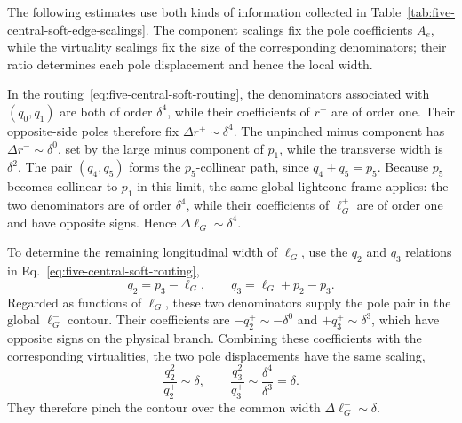 \documentclass[a4paper,11pt]{article}
\begin{document}
The following estimates use both kinds of information collected in
Table~\ref{tab:five-central-soft-edge-scalings}.  The component scalings fix
the pole coefficients \(A_e\), while the virtuality scalings fix the size of
the corresponding denominators; their ratio determines each pole
displacement and hence the local width.

In the routing~\eqref{eq:five-central-soft-routing}, the denominators
associated with \((q_0,q_1)\) are both of order \(\delta^4\), while their
coefficients of \(r^+\) are of order one.  Their opposite-side poles
therefore fix \(\Delta r^+\sim\delta^4\).  The unpinched minus component
has \(\Delta r^-\sim\delta^0\), set by the large minus component of
\(p_1\), while the transverse width is \(\delta^2\).  The pair
\((q_4,q_5)\) forms the \(p_5\)-collinear path, since \(q_4+q_5=p_5\).
Because \(p_5\) becomes collinear to \(p_1\) in this limit, the same global
lightcone frame applies: the two denominators are of order \(\delta^4\),
while their coefficients of \(\ell_G^+\) are of order one and have opposite
signs.  Hence \(\Delta\ell_G^+\sim\delta^4\).

To determine the remaining longitudinal width of \(\ell_G\), use the
\(q_2\) and \(q_3\) relations in Eq.~\eqref{eq:five-central-soft-routing},
\[
 q_2=p_3-\ell_G,
 \qquad
 q_3=\ell_G+p_2-p_3.
\]
Regarded as functions of \(\ell_G^-\), these two denominators supply the
pole pair in the global \(\ell_G^-\) contour.  Their coefficients are
\(-q_2^+\sim-\delta^0\) and
\(+q_3^+\sim\delta^3\), which have opposite signs on the physical branch.
Combining these coefficients with the corresponding virtualities, the two
pole displacements have the same scaling,
\[
 \frac{q_2^2}{q_2^+}\sim\delta,
 \qquad
 \frac{q_3^2}{q_3^+}\sim\frac{\delta^4}{\delta^3}=\delta.
\]
They therefore pinch the contour over the common width
\(\Delta\ell_G^-\sim\delta\).
\end{document}
